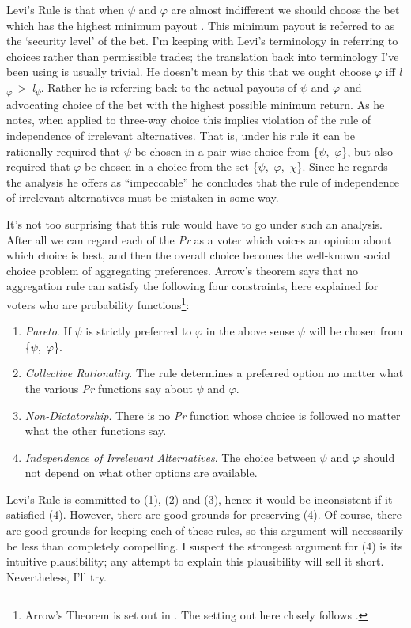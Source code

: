 Levi's Rule is that when $\psi$ and $\varphi$ are almost indifferent we should choose
the bet which has the highest minimum payout \citet{Levi1974, Levi1980, Levi1986}.
This minimum payout is referred to as the `security level' of the bet.
I'm keeping with Levi's terminology in referring to choices rather than
permissible trades; the translation back into terminology I've been
using is usually trivial. He doesn't mean by this that we ought choose $\varphi$
iff \emph{l}\textsubscript{$\varphi$}~\textgreater{}~\emph{l}\textsubscript{$\psi$}.
Rather he is referring back to the actual payouts of $\psi$ and $\varphi$ and
advocating choice of the bet with the highest possible minimum return.
As he notes, when applied to three-way choice this implies violation of
the rule of independence of irrelevant alternatives. That is, under his
rule it can be rationally required that $\psi$ be chosen in a pair-wise
choice from \{$\psi$,~$\varphi$\}, but also required that $\varphi$ be chosen in a choice
from the set \{$\psi$,~$\varphi$,~$\chi$\}. Since he regards the analysis he offers as
``impeccable'' \citeyearpar[411]{Levi1974} he concludes that the rule of independence of
irrelevant alternatives must be mistaken in some way.

It's not too surprising that this rule would have to go under such an
analysis. After all we can regard each of the \emph{Pr} as a voter which
voices an opinion about which choice is best, and then the overall
choice becomes the well-known social choice problem of aggregating
preferences. Arrow's theorem says that no aggregation rule can satisfy
the following four constraints, here explained for voters who are
probability functions\footnote{Arrow's Theorem is set out in \citet{Arrow1963}. The setting out here closely follows \citet{Hausman1991}.}:

\begin{enumerate}
\renewcommand{\theenumi}{(\arabic{enumi})}
\item \emph{Pareto}. If $\psi$ is strictly preferred to $\varphi$ in the above sense $\psi$
will be chosen from \{$\psi$,~$\varphi$\}.
\item \emph{Collective Rationality}. The rule determines a preferred
option no matter what the various \emph{Pr} functions say about $\psi$ and $\varphi$.
\item \emph{Non-Dictatorship}. There is no \emph{Pr} function whose choice
is followed no matter what the other functions say.
\item \emph{Independence of Irrelevant Alternatives}. The choice between $\psi$
and $\varphi$ should not depend on what other options are available.
\end{enumerate}
Levi's Rule is committed to (1), (2) and (3), hence it would be
inconsistent if it satisfied (4). However, there are good grounds for
preserving (4). Of course, there are good grounds for keeping each of
these rules, so this argument will necessarily be less than completely
compelling. I suspect the strongest argument for (4) is its intuitive
plausibility; any attempt to explain this plausibility will sell it
short. Nevertheless, I'll try.

